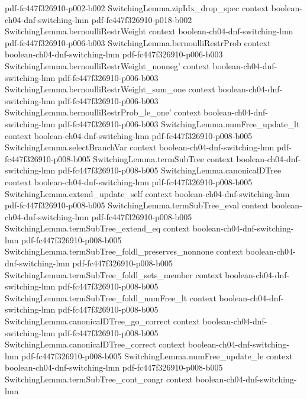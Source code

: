 \begin{theorem}
  {pdf-fc447f326910-p002-b002}
\proofstep
  {SwitchingLemma.zipIdx_drop_spec}
  {context}
  {boolean-ch04-dnf-switching-lmn}
  {pdf-fc447f326910-p018-b002}
\proofstep
  {SwitchingLemma.bernoulliRestrWeight}
  {context}
  {boolean-ch04-dnf-switching-lmn}
  {pdf-fc447f326910-p006-b003}
\proofstep
  {SwitchingLemma.bernoulliRestrProb}
  {context}
  {boolean-ch04-dnf-switching-lmn}
  {pdf-fc447f326910-p006-b003}
\proofstep
  {SwitchingLemma.bernoulliRestrWeight_nonneg'}
  {context}
  {boolean-ch04-dnf-switching-lmn}
  {pdf-fc447f326910-p006-b003}
\proofstep
  {SwitchingLemma.bernoulliRestrWeight_sum_one}
  {context}
  {boolean-ch04-dnf-switching-lmn}
  {pdf-fc447f326910-p006-b003}
\proofstep
  {SwitchingLemma.bernoulliRestrProb_le_one'}
  {context}
  {boolean-ch04-dnf-switching-lmn}
  {pdf-fc447f326910-p006-b003}
\proofstep
  {SwitchingLemma.numFree_update_lt}
  {context}
  {boolean-ch04-dnf-switching-lmn}
  {pdf-fc447f326910-p008-b005}
\proofstep
  {SwitchingLemma.selectBranchVar}
  {context}
  {boolean-ch04-dnf-switching-lmn}
  {pdf-fc447f326910-p008-b005}
\proofstep
  {SwitchingLemma.termSubTree}
  {context}
  {boolean-ch04-dnf-switching-lmn}
  {pdf-fc447f326910-p008-b005}
\proofstep
  {SwitchingLemma.canonicalDTree}
  {context}
  {boolean-ch04-dnf-switching-lmn}
  {pdf-fc447f326910-p008-b005}
\proofstep
  {SwitchingLemma.extend_update_self}
  {context}
  {boolean-ch04-dnf-switching-lmn}
  {pdf-fc447f326910-p008-b005}
\proofstep
  {SwitchingLemma.termSubTree_eval}
  {context}
  {boolean-ch04-dnf-switching-lmn}
  {pdf-fc447f326910-p008-b005}
\proofstep
  {SwitchingLemma.termSubTree_extend_eq}
  {context}
  {boolean-ch04-dnf-switching-lmn}
  {pdf-fc447f326910-p008-b005}
\proofstep
  {SwitchingLemma.termSubTree_foldl_preserves_nonnone}
  {context}
  {boolean-ch04-dnf-switching-lmn}
  {pdf-fc447f326910-p008-b005}
\proofstep
  {SwitchingLemma.termSubTree_foldl_sets_member}
  {context}
  {boolean-ch04-dnf-switching-lmn}
  {pdf-fc447f326910-p008-b005}
\proofstep
  {SwitchingLemma.termSubTree_foldl_numFree_lt}
  {context}
  {boolean-ch04-dnf-switching-lmn}
  {pdf-fc447f326910-p008-b005}
\proofstep
  {SwitchingLemma.canonicalDTree_go_correct}
  {context}
  {boolean-ch04-dnf-switching-lmn}
  {pdf-fc447f326910-p008-b005}
\proofstep
  {SwitchingLemma.canonicalDTree_correct}
  {context}
  {boolean-ch04-dnf-switching-lmn}
  {pdf-fc447f326910-p008-b005}
\proofstep
  {SwitchingLemma.numFree_update_le}
  {context}
  {boolean-ch04-dnf-switching-lmn}
  {pdf-fc447f326910-p008-b005}
\proofstep
  {SwitchingLemma.termSubTree_cont_congr}
  {context}
  {boolean-ch04-dnf-switching-lmn}

\end{theorem}
